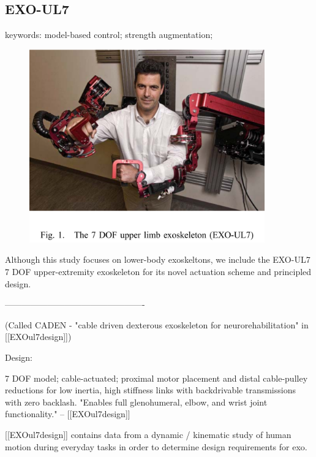 \subsection{EXO-UL7}
\label{exo:exo-ul7}

keywords: model-based control; strength augmentation;\\

\begin{figure}[ht]
  \centering
  \includegraphics[width=4.0in]{exos/figs/exo-ul7.png}
\end{figure}


Although this study focuses on lower-body exoskeltons, we include the EXO-UL7 7 DOF upper-extremity exoskeleton for its novel actuation scheme and principled design. 

-------------------------------------------------

(Called CADEN - "cable driven dexterous exoskeleton for neurorehabilitation" in [[EXOul7design]])

Design:

7 DOF model; cable-actuated; proximal motor placement and distal cable-pulley reductions for low inertia, high stiffness links with backdrivable transmissions with zero backlash.  "Enables full glenohumeral, elbow, and wrist joint functionality." -- [[EXOul7design]]


[[EXOul7design]] contains data from a dynamic / kinematic study of human motion during everyday tasks in order to determine design requirements for exo.

